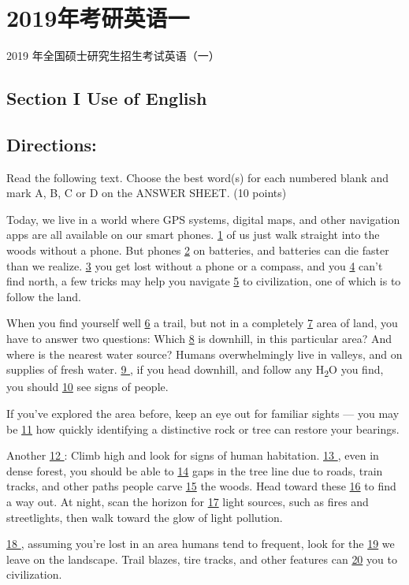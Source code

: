 \documentclass[UTF8,11pt]{ctexart}
\begin{document}
\section*{2019年考研英语一}
2019 年全国硕士研究生招生考试英语（一）


\subsection*{\textbf{Section I Use of English}}


\subsection*{\textbf{Directions:}}


Read the following text. Choose the best word(s) for each numbered blank and mark A, B, C or D on the ANSWER SHEET. (10 points)


Today, we live in a world where GPS systems, digital maps, and other navigation apps are all available on our smart phones. \uline{1} of us just walk straight into the woods without a phone. But phones \uline{2} on batteries, and batteries can die faster than we realize. \uline{3} you get lost without a phone or a compass, and you \uline{4} can’t find north, a few tricks may help you navigate \uline{5} to civilization, one of which is to follow the land.


When you find yourself well \uline{6} a trail, but not in a completely \uline{7} area of land, you have to answer two questions: Which \uline{8} is downhill, in this particular area? And where is the nearest water source? Humans overwhelmingly live in valleys, and on supplies of fresh water. \uline{9 }, if you head downhill, and follow any H\textsubscript{2}O you find, you should \uline{10} see signs of people.


If you’ve explored the area before, keep an eye out for familiar sights — you may be \uline{11} how quickly identifying a distinctive rock or tree can restore your bearings.


Another \uline{12 }: Climb high and look for signs of human habitation. \uline{13 }, even in dense forest, you should be able to \uline{14} gaps in the tree line due to roads, train tracks, and other paths people carve \uline{15} the woods. Head toward these \uline{16} to find a way out. At night, scan the horizon for \uline{17} light sources, such as fires and streetlights, then walk toward the glow of light pollution.


\uline{18 }, assuming you’re lost in an area humans tend to frequent, look for the \uline{19} we leave on the landscape. Trail blazes, tire tracks, and other features can \uline{20} you to civilization.
\end{document}
